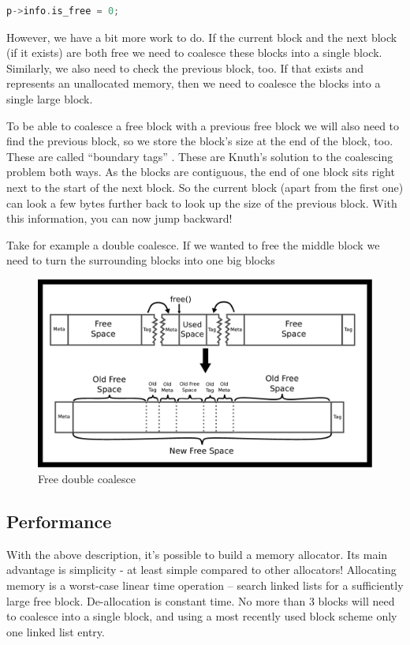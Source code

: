 \begin{lstlisting}[language=C]
p->info.is_free = 0;
\end{lstlisting}

However, we have a bit more work to do.
If the current block and the next block (if it exists) are both free we need to coalesce these blocks into a single block.
Similarly, we also need to check the previous block, too.
If that exists and represents an unallocated memory, then we need to coalesce the blocks into a single large block.

To be able to coalesce a free block with a previous free block we will also need to find the previous block, so we store the block's size at the end of the block, too.
These are called ``boundary tags'' \cite{knuth1973art}.
These are Knuth's solution to the coalescing problem both ways.
As the blocks are contiguous, the end of one block sits right next to the start of the next block.
So the current block (apart from the first one) can look a few bytes further back to look up the size of the previous block.
With this information, you can now jump backward!

Take for example a double coalesce.
If we wanted to free the middle block we need to turn the surrounding blocks into one big blocks

\begin{figure}[H]
\centering
\includegraphics[width=.9\textwidth]{malloc/drawings/malloc_double_coalesce.eps}
\caption{Free double coalesce}
\end{figure}

\subsection{Performance}

With the above description, it's possible to build a memory allocator.
Its main advantage is simplicity - at least simple compared to other allocators!
Allocating memory is a worst-case linear time operation -- search linked lists for a sufficiently large free block.
De-allocation is constant time.
No more than 3 blocks will need to coalesce into a single block, and using a most recently used block scheme only one linked list entry.

